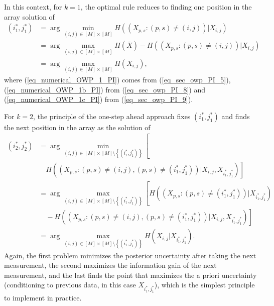 In this context, for $k=1$, the optimal rule reduces to finding one position in the array solution of
\begin{align}\label{eq_numerical_OWP_1_PI}
	(i^*_1,j^*_1) 	&= \arg \min_{(i,j)\in [M]\times [M]} H((X_{p,s}: (p,s)\neq (i,j)) | X_{i,j})\\
				\label{eq_numerical_OWP_1b_PI}
				&= \arg \max_{(i,j)\in [M]\times [M]} H(\bar{X})- H((X_{p,s}: (p,s)\neq (i,j)) | X_{i,j})\\
				\label{eq_numerical_OWP_1c_PI}
				&=\arg \max_{(i,j)\in [M]\times [M]} H(X_{i,j}),
\end{align}
where (\ref{eq_numerical_OWP_1_PI}) comes from (\ref{eq_sec_owp_PI_5}), (\ref{eq_numerical_OWP_1b_PI}) from (\ref{eq_sec_owp_PI_8}) and (\ref{eq_numerical_OWP_1c_PI}) from (\ref{eq_sec_owp_PI_9}). 

For $k=2$, the principle of the one-step ahead approach fixes $(i^*_1,j^*_1)$ and finds the next position in 
the array as the solution of 
\begin{align}\label{eq_numerical_OWP_2_PI}
	(i^*_2,j^*_2) 	&= \arg \min_{(i,j)\in [M]\times [M]  \setminus \left\{(i^*_1,j^*_1)\right\}} \left[ \right. \nonumber\\ 
				& \quad H((X_{p,s}: (p,s)\neq (i,j), (p,s)\neq (i^*_1,j^*_1)) | X_{i,j}, X_{i^*_1,j^*_1}) \left. \right]  \\
				&= \arg \max_{(i,j)\in [M]\times [M] \setminus \left\{(i^*_1,j^*_1)\right\}}  \left[ \right.  H( (X_{p,s}: (p,s)\neq (i^*_1,j^*_1)) | X_{i^*_1,j^*_1})\nonumber\\
				& \quad - H((X_{p,s}: (p,s)\neq (i,j), (p,s)\neq (i^*_1,j^*_1)) | X_{i,j}, X_{i^*_1,j^*_1})  \left. \right] \\
				&=\arg \max_{(i,j)\in [M]\times [M] \setminus \left\{(i^*_1,j^*_1)\right\}} H(X_{i,j}|X_{i^*_1,j^*_1}).
\end{align}
Again, the first problem  minimizes the posterior uncertainty after taking the next measurement, the second maximizes the information gain of the next measurement, and the last finds the point that maximizes the a priori uncertainty (conditioning to previous data, in this case $X_{i^*_1,j^*_1}$), which is the simplest principle to implement in practice.

